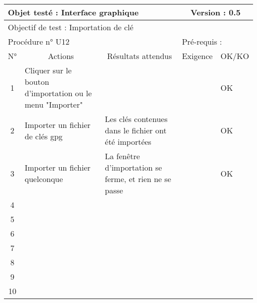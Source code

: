 \documentclass{../res/univ-projet}
\begin{document}
\begin{center}
    \begin{tabular}{|c|p{5cm}|p{5cm}|p{1.5cm}|p{1.5cm}|}
      \hline
      \multicolumn{3}{|l|}{Objet testé : Interface graphique} & \multicolumn{2}{c|}{Version : 0.5}\\ \hline
      \multicolumn{5}{|l|}{Objectif de test : Importation de clé}\\ \hline
      \multicolumn{3}{|l|}{Procédure n° U12} & \multicolumn{2}{p{3cm}|}{Pré-requis : }\\ \hline
      \multicolumn{1}{|c|}{N°} & \multicolumn{1}{c|}{Actions} & \multicolumn{1}{c|}{Résultats attendus} & 
      \multicolumn{1}{c|}{Exigence} & \multicolumn{1}{c|}{OK/KO}\\ \hline
      1 & Cliquer sur le bouton d'importation ou le menu "Importer" &  &  & OK \\
      2 & Importer un fichier de clés gpg & Les clés contenues dans le fichier ont été importées &  & OK \\
      3 & Importer un fichier quelconque & La fenêtre d'importation se ferme, et rien ne se passe &  & OK \\
      4 &  &  &  &  \\
      5 &  &  &  &  \\
      6 &  &  &  &  \\
      7 &  &  &  &  \\
      8 &  &  &  &  \\
      9 &  &  &  & \\
      10 &  &  &  & \\ 
  \hline
    \end{tabular}
    \vskip 2.2cm    


\end{center}
\end{document}
